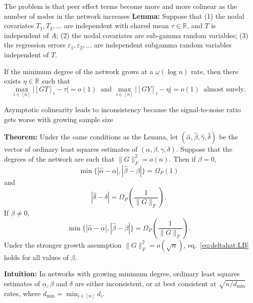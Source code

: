 \documentclass[final]{beamer}
\newcommand{\R}{\mathbb{R}}
\newcommand{\alphahat}{\hat{\alpha}}
\newcommand{\gammahat}{\hat{\gamma}}
\newcommand{\deltahat}{\hat{\delta}}
\newcommand{\betahat}{\hat{\beta}}
\newcommand \Omegap [1] {\Omega_P \left(#1\right)}
\newlength{\colwidth}
\begin{document}
\begin{frame}[t]
\begin{columns}[t]
\begin{column}{\colwidth}
\begin{block}{The problem is that peer effect terms become more and more colinear as the number of nodes in the network increases}
                \textbf{Lemma:} Suppose that (1) the nodal covariates $T_1, T_2, \dots$ are independent with shared mean $\tau \in \R$, and $T$ is independent of $A$; (2) the nodal covariates are sub-gamma random variables; (3) the regression errors $\varepsilon_1, \varepsilon_2, \dots$ are independent subgamma random variables independent of $T$.

                If the minimum degree of the network grows at a $\omega(\log n)$ rate, then there exists $\eta \in \R$ such that
                \begin{equation*}
                    \max_{i \in [n]} \Big| [GT]_i - \tau \Big|
                    = o(1) ~ \text{ and }
                    \max_{i \in [n]} \Big| [GY]_i - \eta \Big| = o(1)~ \text{ almost surely.}
                \end{equation*}
            \end{block}

            \begin{block}{Asymptotic colinearity leads to inconsistency because the signal-to-noise ratio gets worse with growing sample size}

                \textbf{Theorem:} Under the same conditions as the Lemma, let $(\alphahat, \betahat, \gammahat, \deltahat)$ be the vector of ordinary least squares estimates of $(\alpha, \beta, \gamma, \delta)$. Suppose that the degrees of the network are such that $\| G \|_F^2 = o(n)$.
                Then if $\beta = 0$,
                \begin{equation*}
                    \min\{ |\alphahat-\alpha|, |\betahat-\beta| \}
                    = \Omegap{ 1 }
                \end{equation*}
                and
                \begin{equation} \label{eq:deltahat:LB}
                    | \deltahat - \delta | = \Omegap{ \frac{1}{\|G\|_F} }.
                \end{equation}
                If $\beta \neq 0$,
                \begin{equation*}
                    \min\{ |\alphahat-\alpha|, |\betahat-\beta| \}
                    = \Omegap{ \frac{1}{\|G\|_F} }.
                \end{equation*}
                Under the stronger growth assumption $\|G\|_F^2 = o( \sqrt{n} )$, eq.~\eqref{eq:deltahat:LB} holds for all values of $\beta$.
                \vspace{3mm}

                \textbf{Intuition:} In networks with growing minimum degree, ordinary least squares estimates of $\alpha, \beta$ and $\delta$ are either inconsistent, or at best consistent at $\sqrt{n / d_\mathrm{min}}$ rates, where $d_\mathrm{min} = \min_{i \in [n]} d_i$.
            \end{block}
        \end{column}


\end{columns}
\end{frame}
\end{document}
